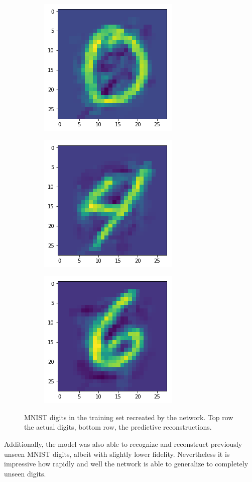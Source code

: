\begin{figure}[H]
\bigskip
\begin{subfigure}{.3\linewidth}
    \centering
    \includegraphics[scale=0.4]{chapter_3_figures/mnist_test_0.png}
\end{subfigure}
    \hfill
\begin{subfigure}{.3\linewidth}
    \centering
    \includegraphics[scale=0.4]{chapter_3_figures/mnist_test_4.png}
\end{subfigure}
   \hfill
\begin{subfigure}{.3\linewidth}
    \centering
    \includegraphics[scale=0.4]{chapter_3_figures/mnist_test_6.png}
\end{subfigure}
\caption{MNIST digits in the training set recreated by the network. Top row the actual digits, bottom row, the predictive reconstructions.}
\end{figure}
Additionally, the model was also able to recognize and reconstruct previously unseen MNIST digits, albeit with slightly lower fidelity. Nevertheless it is impressive how rapidly and well the network is able to generalize to completely unseen digits.
\newline
\bigskip

